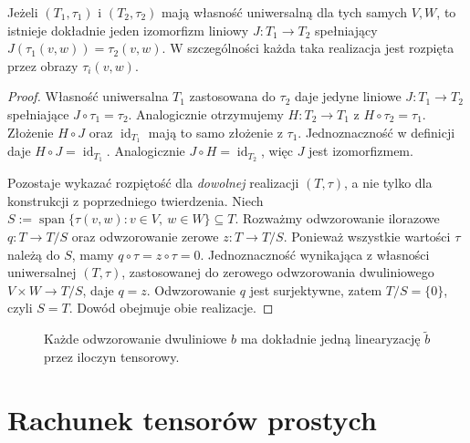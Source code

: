 \begin{twierdzenie}
\label{thm:lin9-jednoznacznosc}
Jeżeli \((T_1,\tau_1)\) i
\((T_2,\tau_2)\) mają własność
uniwersalną dla tych samych \(V,W\),
to istnieje dokładnie jeden
izomorfizm liniowy \(J\colon T_1\to T_2\)
spełniający
\(J(\tau_1(v,w))=\tau_2(v,w)\).
W szczególności każda taka realizacja
jest rozpięta przez obrazy \(\tau_i(v,w)\).
\end{twierdzenie}
\begin{proof}
Własność uniwersalna \(T_1\)
zastosowana do \(\tau_2\) daje
jedyne liniowe \(J\colon T_1\to T_2\)
spełniające \(J\circ\tau_1=\tau_2\).
Analogicznie otrzymujemy
\(H\colon T_2\to T_1\) z
\(H\circ\tau_2=\tau_1\).
Złożenie \(H\circ J\) oraz
\(\operatorname{id}_{T_1}\)
mają to samo złożenie z \(\tau_1\).
Jednoznaczność w definicji daje
\(H\circ J=\operatorname{id}_{T_1}\).
Analogicznie
\(J\circ H=\operatorname{id}_{T_2}\),
więc \(J\) jest izomorfizmem.

Pozostaje wykazać rozpiętość
dla \emph{dowolnej} realizacji
\((T,\tau)\), a nie tylko
dla konstrukcji z poprzedniego
twierdzenia. Niech
\(S:=\operatorname{span}\{\tau(v,w):
v\in V,\ w\in W\}\subseteq T\).
Rozważmy odwzorowanie ilorazowe
\(q\colon T\to T/S\) oraz
odwzorowanie zerowe
\(z\colon T\to T/S\).
Ponieważ wszystkie wartości
\(\tau\) należą do \(S\),
mamy \(q\circ\tau=z\circ\tau=0\).
Jednoznaczność wynikająca
z własności uniwersalnej \((T,\tau)\),
zastosowanej do zerowego
odwzorowania dwuliniowego
\(V\times W\to T/S\),
daje \(q=z\).
Odwzorowanie \(q\)
jest surjektywne, zatem
\(T/S=\{0\}\), czyli \(S=T\).
Dowód obejmuje obie realizacje.
\end{proof}

\begin{figure}[!htbp]
\centering
{}
\caption{Każde odwzorowanie dwuliniowe
\(b\) ma dokładnie jedną linearyzację
\(\widetilde b\) przez iloczyn tensorowy.}
\label{fig:lin9-uniwersalna}
\end{figure}

\section{Rachunek tensorów prostych}
\label{sec:lin9-proste}

